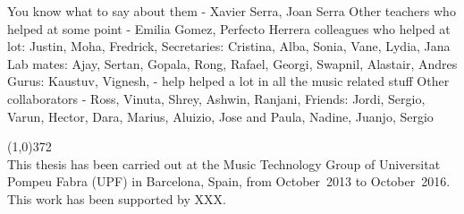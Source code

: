
You know what to say about them - Xavier Serra, Joan Serra
Other teachers who helped at some point -  Emilia Gomez, Perfecto Herrera
colleagues who helped at lot: Justin, Moha, Fredrick,
Secretaries: Cristina, Alba, Sonia, Vane, Lydia, Jana
Lab mates: Ajay, Sertan, Gopala, Rong, Rafael, Georgi, Swapnil, Alastair, Andres
Gurus:  Kaustuv, Vignesh, -  help helped a lot in all the music related stuff
Other collaborators - Ross, Vinuta, Shrey, Ashwin, Ranjani, 
Friends: Jordi, Sergio, Varun, Hector, Dara, Marius, Aluizio, Jose and Paula, Nadine, Juanjo, Sergio

\vspace*{\fill}

\line(1,0){372}\\
\footnotesize
This thesis has been carried out at the Music Technology Group of Universitat Pompeu Fabra (UPF) in Barcelona, Spain, from October~2013 to October~2016. This work has been supported by XXX.
\normalsize